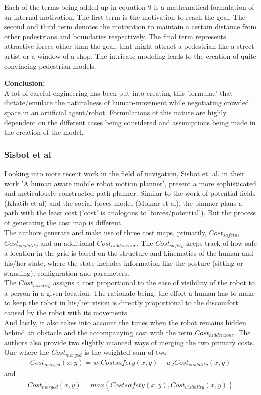 Each of the terms being added up in equation 9 is a mathematical formulation of an internal motivation.
The first term is the motivation to reach the goal.
The second and third term denotes the motivation to maintain a certain distance from other pedestrians and boundaries respectively.
The final term represents attractive forces other than the goal, that might attract a pedestrian like a street artist or a window of a shop.
The intricate modeling leads to the creation of quite convincing pedestrian models. 
\par
\textbf{Conclusion:}\\
A lot of careful engineering has been put into creating this 'formulae' that dictate/emulate the naturalness of human-movement while negotiating crowded space in an artificial agent/robot. 
Formulations of this nature are highly dependent on the different cases being considered and assumptions being made in the creation of the model. 
\subsubsection*{Sisbot et al}
Looking into more recent work in the field of navigation,
Sisbot et. al. in their work 'A human aware mobile robot motion planner', present a more sophisticated and meticulously constructed path planner. Similar to the work of potential fields (Khatib et al) and the social forces model (Molnar et al), the planner plans a path with the least cost ('cost' is analogous to 'forces/potential'). But the process of generating the cost map is different.\\
The authors generate and make use of three cost maps, primarily, $Cost_{safety}$, $Cost_{visibility}$ and an additional $Cost_{hidden zone}$.
The $Cost_{safety}$ keeps track of how safe a location in the grid is based on the structure and kinematics of the human and his/her state, where the state includes information like the posture (sitting or standing), configuration and parameters.\\
The $Cost_{visbility}$ assigns a cost proportional to the ease of visibility of the robot to a person in a given location. The rationale being, the effort a human has to make to keep the robot in his/her vision is directly proportional to the discomfort caused by the robot with its movements.\\
And lastly, it also takes into account the times when the robot remains hidden behind an obstacle and the accompanying cost with the term $Cost_{hidden zone}$. 
The authors also provide two slightly nuanced ways of merging the two primary costs. One where the $Cost_{merged}$ is the weighted sum of two
\begin{align}
Cost_{merged}(x,y) = w_{1}Cost{safety}(x,y) + w_{2}Cost_{visibility}(x,y)
\end{align}
and 
\begin{align}
Cost_{merged}(x,y) = max(Cost{safety}(x,y), Cost_{visibility}(x,y))
\end{align}

